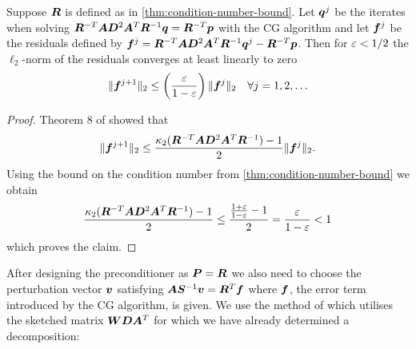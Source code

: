 \begin{theorem} \label{thm:cg-residual-bound}
Suppose \(\bm{R}\) is defined as in \cref{thm:condition-number-bound}.
Let \(\bm{q}^j\) be the iterates when solving \( \bm{R}^{-T} \bm{A} \bm{D}^2 \bm{A}^T \bm{R}^{-1} \bm{q} = \bm{R}^{-T} \bm{p} \) with the CG algorithm and let \(\bm{f}^j\) be the residuals defined by
\( \bm{f}^j = \bm{R}^{-T} \bm{A} \bm{D}^2 \bm{A}^T \bm{R}^{-1} \bm{q}^j - \bm{R}^{-T} \bm{p} \).
Then for \(\varepsilon < 1/2\) the \(\ell_2\)-norm of the residuals converges at least linearly to zero
\[ \lVert \bm{f}^{j+1} \rVert_2 \leq \left( \frac{\varepsilon}{1-\varepsilon} \right) \lVert  \bm{f}^j  \rVert_2 \quad \forall j = 1, 2, \ldots \]
\end{theorem}
\begin{proof}
Theorem 8 of \cite{Bouyouli-ConjugateGradientConvergence} showed that
\[ \lVert \bm{f}^{j+1} \rVert_2 \leq \frac{\kappa_2(\bm{R}^{-T} \bm{A} \bm{D}^2 \bm{A}^T \bm{R}^{-1}) - 1}{2} \lVert \bm{f}^j \rVert_2 .\]
Using the bound on the condition number from \cref{thm:condition-number-bound} we obtain
\[ \frac{\kappa_2(\bm{R}^{-T} \bm{A} \bm{D}^2 \bm{A}^T \bm{R}^{-1}) - 1}{2}
   \leq \frac{\frac{1+\varepsilon}{1-\varepsilon} - 1}{2} = \frac{\varepsilon}{1 - \varepsilon} < 1 \]
which proves the claim.
\end{proof}

After designing the preconditioner as \(\bm{P} = \bm{R}\) we also need to choose the perturbation vector \(\bm{v}\) satisfying \(\bm{A}\bm{S}^{-1}\bm{v} = \bm{R}^T \bm{f}\) where \(\bm{f}\), the error term introduced by the CG algorithm, is given.
We use the method of \textcite{Avron-FasterRandomizedInfeasibleIPMs} which utilises the sketched matrix \(\bm{W}\bm{D}\bm{A}^T\) for which we have already determined a decomposition:


